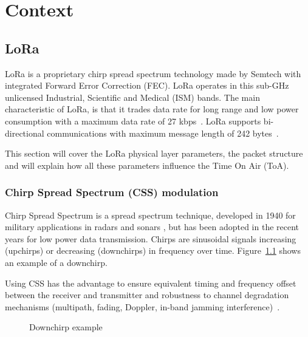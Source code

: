 \chapter{Context}


\section{LoRa\label{section:lora}}

LoRa is a proprietary chirp spread spectrum technology made by Semtech with
integrated Forward Error Correction (FEC).
LoRa operates in this sub-GHz unlicensed Industrial, Scientific and Medical
(ISM) bands.
The main characteristic of LoRa, is that it trades data rate for long range 
and low power consumption with a maximum data rate of 27 kbps~\cite{8030482}.
LoRa supports bi-directional communications with maximum message length of 242
bytes~\cite{loraalliance:lorawanspecification}.

This section will cover the LoRa physical layer parameters, the packet structure and 
will explain how all these parameters influence the Time On Air (ToA).

\subsection{Chirp Spread Spectrum (CSS) modulation}

Chirp Spread Spectrum is a spread spectrum technique, developed in 1940 for
military applications in radars and sonars \cite{semtech:modulationbasics}, but
has been adopted in the recent years for low power data transmission.
Chirps are sinusoidal signals increasing (upchirps) or decreasing (downchirps)
in frequency over time.
Figure~\ref{fig:downchirp} shows an example of a downchirp.

Using CSS has the advantage to ensure equivalent timing and frequency offset
between the receiver and transmitter and robustness to channel degradation
mechanisms (multipath, fading, Doppler, in-band jamming
interference)~\cite{semtech:modulationbasics}.


\begin{figure}[H]
\centering
{} 
\caption{Downchirp example\label{fig:downchirp}}
\end{figure}

